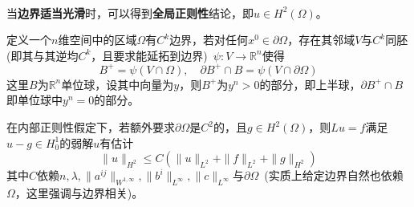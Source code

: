 \documentclass[a4paper,UTF8,fontset=windows,AutoFakeBold]{ctexart}
\begin{document}
\

当\textbf{边界适当光滑}时，可以得到\textbf{全局正则性}结论，即$u\in H^2(\Omega)$。

定义一个$n$维空间中的区域$\Omega$有$C^k$边界，若对任何$x^0\in\partial\Omega$，存在其邻域$V$与$C^k$同胚(即其与其逆均$C^k$，且要求能延拓到边界)\ $\psi:V\to\mathbb{R}^n$使得
$$B^+=\psi(V\cap\Omega),\quad \partial B^+\cap B=\psi(V\cap\partial\Omega)$$
这里$B$为$\mathbb{R}^n$单位球，设其中向量为$y$，则$B^+$为$y^n>0$的部分，即上半球，$\partial B^+\cap B$即单位球中$y^n=0$的部分。

在内部正则性假定下，若额外要求$\partial\Omega$是$C^2$的，且$g\in H^2(\Omega)$，则$Lu=f$满足$u-g\in H_0^1$的弱解$u$有估计
$$\|u\|_{H^2}\le C(\|u\|_{L^2}+\|f\|_{L^2}+\|g\|_{H^2})$$
其中$C$依赖$n,\lambda,\|a^{ij}\|_{W^{1,\infty}},\|b^i\|_{L^\infty},\|c\|_{L^\infty}$与$\partial\Omega$\ (实质上给定边界自然也依赖$\Omega$，这里强调与边界相关)。
\end{document}

